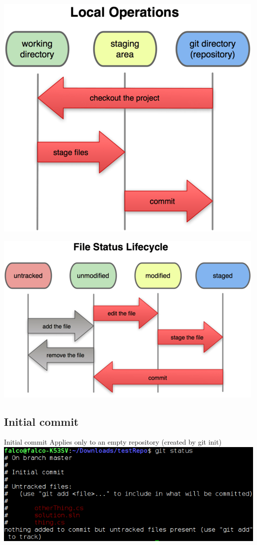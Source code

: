 \documentclass[10pt,a4paper]{beamer}
\begin{document}
\begin{frame}[plain]
\includegraphics[width=\linewidth]{threeStates.png}
\end{frame}

\begin{frame}[plain]
\includegraphics[width=\linewidth]{fileLifeCycle.png}
\end{frame}

\subsection{Initial commit}
\begin{frame}{Initial commit}
Applies only to an empty repository (created by git init)
\includegraphics[width=\linewidth]{gitStatus1.png}
\end{frame}
\end{document}
